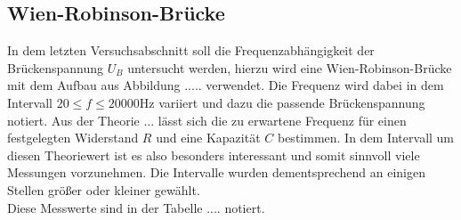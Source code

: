 \subsection{Wien-Robinson-Brücke}
In dem letzten Versuchsabschnitt soll die Frequenzabhängigkeit der Brückenspannung $U_{B}$ untersucht werden, hierzu wird eine Wien-Robinson-Brücke mit dem Aufbau aus 
Abbildung ..... verwendet. Die Frequenz wird dabei in dem Intervall $20 \leq f \leq 20000 \si{\hertz}$ variiert und dazu die passende Brückenspannung notiert. Aus der Theorie ...
lässt sich die zu erwartene Frequenz für einen festgelegten Widerstand $R$ und eine Kapazität $C$ bestimmen. In dem Intervall um diesen Theoriewert ist es also besonders interessant und somit sinnvoll viele Messungen vorzunehmen.
Die Intervalle wurden dementsprechend an einigen Stellen größer oder kleiner gewählt. 
\\
\newline
Diese Messwerte sind in der Tabelle .... notiert.

